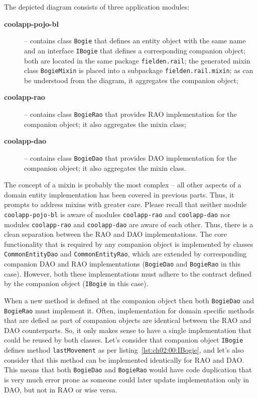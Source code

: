   The depicted diagram consists of three application modules:
  \begin{description}
   \item[\textbf{coolapp-pojo-bl}] -- contains class \texttt{Bogie} that defines an entity object with the same name and an interface \texttt{IBogie} that defines a corresponding companion object; both are located in the same package \texttt{fielden.rail}; the generated mixin class \texttt{BogieMixin} is placed into a subpackage \texttt{fielden.rail.mixin}; as can be understood from the diagram, it aggregates the companion object;
   \item[\textbf{coolapp-rao}] -- contains class \texttt{BogieRao} that provides RAO implementation for the companion object; it also aggregates the mixin class;
   \item[\textbf{coolapp-dao}] -- contains class \texttt{BogieDao} that provides DAO implementation for the companion object; it also aggregates the mixin class.
  \end{description}

  The concept of a mixin is probably the most complex -- all other aspects of a domain entity implementation has been covered in previous parts.
  Thus, it prompts to address mixins with greater care.
  Please recall that neither module \texttt{coolapp-pojo-bl} is aware of modules \texttt{coolapp-rao} and \texttt{coolapp-dao} nor modules \texttt{coolapp-rao} and \texttt{coolapp-dao} are aware of each other.
  Thus, there is a clean separation between the RAO and DAO implementations.  
  The core functionality that is required by any companion object is implemented by classes \texttt{CommonEntityDao} and \texttt{CommonEntityRao}, which are extended by corresponding companion DAO and RAO implementations (\texttt{BogieDao} and \texttt{BogieRao} in this case).  
  However, both these implementations must adhere to the contract defined by the companion object (\texttt{IBogie} in this case).
  
  When a new method is defined at the companion object then both \texttt{BogieDao} and \texttt{BogieRao} must implement it.
  Often, implementation for domain specific methods that are defied as part of companion objects are identical between the RAO and DAO counterparts.
  So, it only makes sense to have a single implementation that could be reused by both classes.  
  Let's consider that companion object \texttt{IBogie} defines method \texttt{lastMovement} as per listing~\ref{lst:ch02:00:IBogie}, and let's also consider that this method can be implemented identically for RAO and DAO.
  This means that both \texttt{BogieDao} and \texttt{BogieRao} would have code duplication that is very much error prone as someone could later update implementation only in DAO, but not in RAO or wise versa.
  
